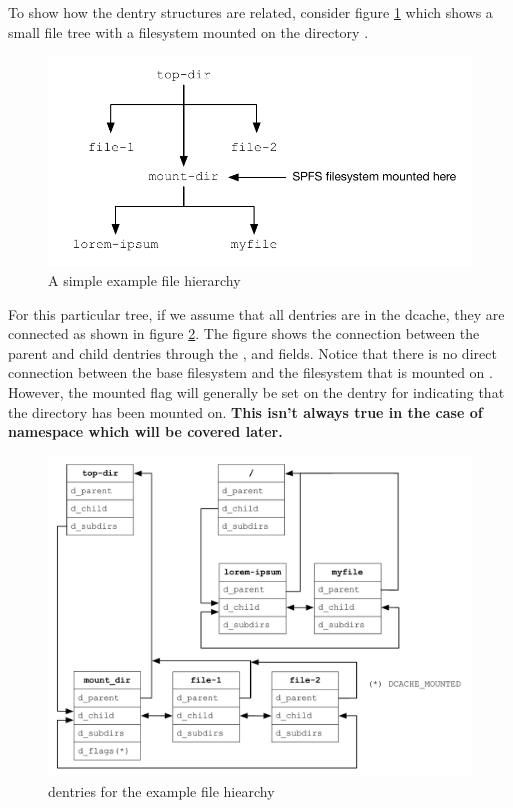 To show how the dentry structures are related, consider figure \ref{fig:kernel-pathname-tree} which shows a small file tree with a filesystem mounted on the directory .

\begin{figure}[h]
	\includegraphics[scale=0.6]{figures/kernel-pathname-tree.pdf}
	\centering
	\caption{A simple example file hierarchy}
	\label{fig:kernel-pathname-tree}
\end{figure}

For this particular tree, if we assume that all dentries are in the dcache, they are connected as shown in figure \ref{fig:kernel-pathname-dentries}. The figure shows the connection between the parent and child dentries through the ,  and  fields. Notice that there is no direct connection between the base filesystem and the filesystem that is mounted on . However, the  mounted flag will generally be set on the dentry for  indicating that the directory has been mounted on. \textbf{This isn't always true in the case of namespace which will be covered later.}

\begin{figure}[h]
	\includegraphics[scale=0.6]{figures/kernel-pathname-dentries.pdf}
	\centering
	\caption{dentries for the example file hiearchy}
	\label{fig:kernel-pathname-dentries}
\end{figure}

